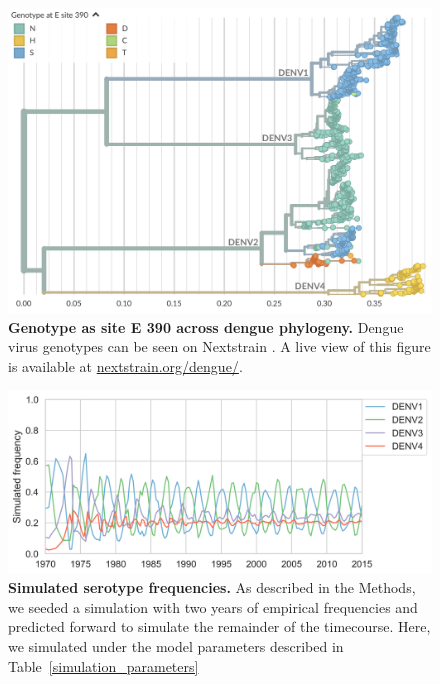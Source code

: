 \documentclass[11pt,oneside,letterpaper]{article}
\begin{document}
\begin{figure}[ht]
  \centering
  \includegraphics[width=\textwidth]{../figures/png/phylogeny_homoplasy.png}
  \caption{\textbf{Genotype as site E 390 across dengue phylogeny.}
  Dengue virus genotypes can be seen on Nextstrain \citep{hadfield2018nextstrain}.
  A live view of this figure is available at \href{https://nextstrain.org/dengue/}{nextstrain.org/dengue/}.}
\label{phylogeny_homoplasy}
\end{figure}

\begin{figure}[ht]
  \centering
  \includegraphics[width=\textwidth]{../figures/png/simulated_frequencies_high_beta.png}
  \caption{\textbf{Simulated serotype frequencies.}
  As described in the Methods, we seeded a simulation with two years of empirical frequencies and predicted forward to simulate the remainder of the timecourse.
  Here, we simulated under the model parameters described in Table~\ref{simulation_parameters}}
\label{simulation_parameter_recovery}
\end{figure}
\end{document}
